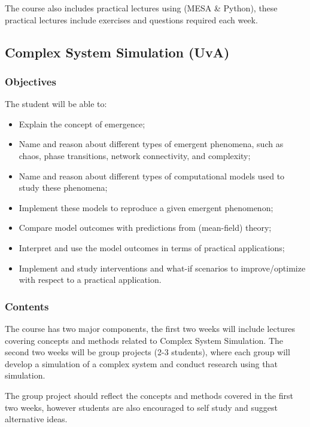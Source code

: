 \documentclass[11pt]{article}
\begin{document}
The course also includes practical lectures using (MESA \& Python), these
practical lectures include exercises and questions required each week.

\subsection{Complex System Simulation (UvA)}
\label{sec:org10f6f53}

\subsubsection{Objectives}
\label{sec:org12b9a30}

The student will be able to:

\begin{itemize}
\item Explain the concept of emergence;
\item Name and reason about different types of emergent phenomena, such as chaos,
phase transitions, network connectivity, and complexity;
\item Name and reason about different types of computational models used to study
these phenomena;
\item Implement these models to reproduce a given emergent phenomenon;
\item Compare model outcomes with predictions from (mean-field) theory;
\item Interpret and use the model outcomes in terms of practical applications;
\item Implement and study interventions and what-if scenarios to improve/optimize
with respect to a practical application.
\end{itemize}

\subsubsection{Contents}
\label{sec:orgec04532}

The course has two major components, the first two weeks will include lectures
covering concepts and methods related to Complex System Simulation. The second
two weeks will be group projects (2-3 students), where each group will develop a
simulation of a complex system and conduct research using that simulation.

The group project should reflect the concepts and methods covered in the first
two weeks, however students are also encouraged to self study and suggest
alternative ideas.
\end{document}
